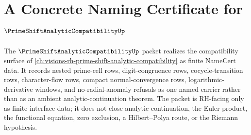 \chapter{A Concrete Naming Certificate for $\PrimeShiftAnalyticCompatibilityUp$}
\label{ch:concrete-instances-prime-shift-analytic-compatibility-namecert}

The $\PrimeShiftAnalyticCompatibilityUp$ packet realizes the compatibility surface of \autoref{ch:visions-rh-prime-shift-analytic-compatibility} as finite NameCert data. It records nested prime-cell rows, digit-congruence rows, cocycle-transition rows, character-flow rows, compact normal-convergence rows, logarithmic-derivative windows, and no-radial-anomaly refusals as one named carrier rather than as an ambient analytic-continuation theorem. The packet is RH-facing only as finite interface data; it does not close analytic continuation, the Euler product, the functional equation, zero exclusion, a Hilbert--Polya route, or the Riemann hypothesis.

